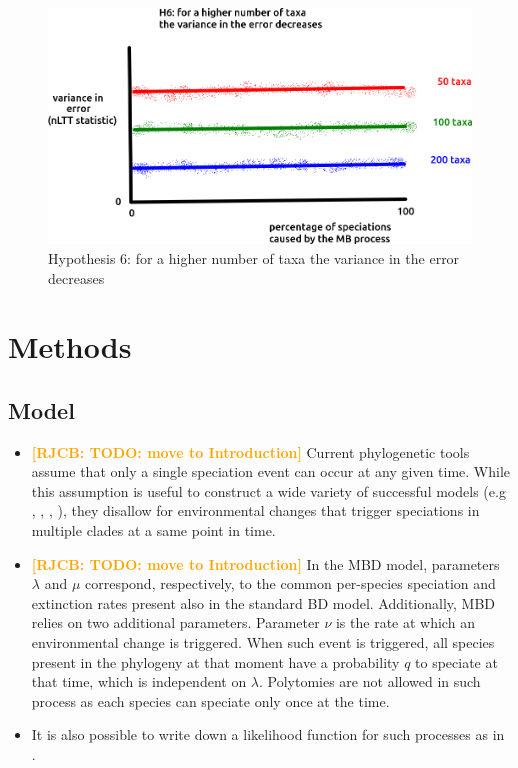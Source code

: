 \documentclass{article}
\newcommand*\richel[1]{\textcolor{orange}{\textbf{[RJCB: #1]}}}
\begin{document}
\begin{itemize}
\begin{figure}[!htbp]
  \includegraphics[width=\textwidth]{fig_h_6.png}
  \caption{
    Hypothesis 6: for a higher number of taxa 
    the variance in the error decreases
  }
  \label{fig:h_6}
\end{figure}

\end{itemize}

\section{Methods}

\subsection{Model}
\begin{itemize}

\item 
\richel{TODO: move to Introduction}
Current phylogenetic tools assume that only a single speciation event 
can occur at any given time.
While this assumption is useful to construct a wide variety of successful 
models (e.g \cite{Maddison2007biSSE}, \cite{Valente2015}, 
\cite{etienne2012diversity}, \cite{etienne2014estimating}),
they disallow for environmental changes that trigger speciations 
in multiple clades at a same point in time. 

\item 
\richel{TODO: move to Introduction}
In the MBD model, parameters $\lambda$ and $\mu$ correspond, respectively, 
to the common per-species speciation and extinction rates present 
also in the standard BD model. 
Additionally, MBD relies on two additional parameters. 
Parameter $\nu$ is the rate at which an environmental change is triggered.
When such event is triggered, 
all species present in the phylogeny at that moment
have a probability $q$ to speciate at that time, which is 
independent on $\lambda$. 
Polytomies are not allowed in such process 
as each species can speciate only once at the time.

\item It is also possible to write down a likelihood function 
for such processes as in \cite{mbd}.
    
\end{itemize}
\end{document}
